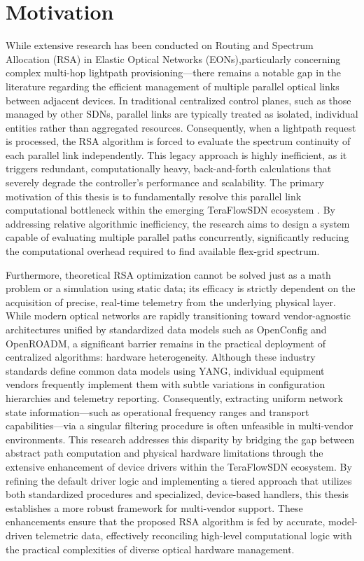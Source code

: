 \section{Motivation}
While extensive research has been conducted on Routing and Spectrum Allocation (RSA) in Elastic Optical Networks (EONs)\cite{algorithmsRSATaxonomy}\cite{efficientDynamicRSAEon},particularly concerning complex multi-hop lightpath provisioning\cite{heuristicWSAMultihop}—there remains a notable gap in the literature regarding the efficient management of multiple parallel optical links between adjacent devices. In traditional centralized control planes, such as those managed by other SDNs, parallel links are typically treated as isolated, individual entities rather than aggregated resources\cite{novelRoutingWSA}. Consequently, when a lightpath request is processed, the RSA algorithm is forced to evaluate the spectrum continuity of each parallel link independently\cite{efficientDynamicRSAEon}. This legacy approach is highly inefficient, as it triggers redundant, computationally heavy, back-and-forth calculations that severely degrade the controller's performance and scalability. The primary motivation of this thesis is to fundamentally resolve this parallel link computational bottleneck within the emerging TeraFlowSDN ecosystem \cite{aboutTFS}. By addressing relative algorithmic inefficiency, the research aims to design a system capable of evaluating multiple parallel paths concurrently, significantly reducing the computational overhead required to find available flex-grid spectrum.

Furthermore, theoretical RSA optimization cannot be solved just as a math problem or a simulation using static data; its efficacy is strictly dependent on the acquisition of precise, real-time telemetry from the underlying physical layer. While modern optical networks are rapidly transitioning toward vendor-agnostic architectures unified by standardized data models such as OpenConfig\cite{openconfigYang} and OpenROADM\cite{openroadmYang}, a significant barrier remains in the practical deployment of centralized algorithms: hardware heterogeneity. Although these industry standards define common data models using YANG, individual equipment vendors frequently implement them with subtle variations in configuration hierarchies and telemetry reporting. Consequently, extracting uniform network state information—such as operational frequency ranges and transport capabilities—via a singular filtering procedure is often unfeasible in multi-vendor environments. This research addresses this disparity by bridging the gap between abstract path computation and physical hardware limitations through the extensive enhancement of device drivers within the TeraFlowSDN ecosystem. By refining the default driver logic and implementing a tiered approach that utilizes both standardized procedures and specialized, device-based handlers, this thesis establishes a more robust framework for multi-vendor support. These enhancements ensure that the proposed RSA algorithm is fed by accurate, model-driven telemetric data, effectively reconciling high-level computational logic with the practical complexities of diverse optical hardware management.
